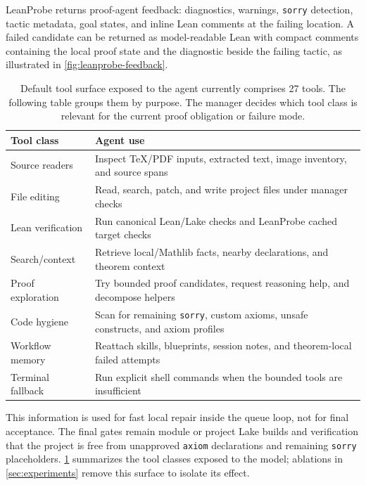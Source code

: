 \documentclass{article}
\newcommand{\lean}{Lean\xspace}
\newcommand{\mathlib}{Mathlib\xspace}
\begin{document}
LeanProbe returns proof-agent feedback: diagnostics, warnings, \texttt{sorry} detection, tactic metadata, goal states, and inline \lean comments at the failing location.
A failed candidate can be returned as model-readable \lean with compact comments containing the local proof state and the diagnostic beside the failing tactic, as illustrated in \cref{fig:leanprobe-feedback}.

\begin{table}[bth]
\centering
\caption{Default tool surface exposed to the agent currently comprises 27 tools. The following table groups them by purpose. The manager decides which tool class is relevant for the current proof obligation or failure mode.}
\label{tab:toolset}
\scriptsize
\setlength{\tabcolsep}{3pt}
\begin{tabular}{p{21mm}p{54mm}}
\toprule
Tool class & Agent use \\
\midrule
Source readers & Inspect \TeX/PDF inputs, extracted text, image inventory, and source spans \\
File editing & Read, search, patch, and write project files under manager checks \\
Lean verification & Run canonical \lean/Lake checks and LeanProbe cached target checks \\
Search/context & Retrieve local/\mathlib facts, nearby declarations, and theorem context \\
Proof exploration & Try bounded proof candidates, request reasoning help, and decompose helpers \\
Code hygiene & Scan for remaining \texttt{sorry}, custom axioms, unsafe constructs, and axiom profiles \\
Workflow memory & Reattach skills, blueprints, session notes, and theorem-local failed attempts \\
Terminal fallback & Run explicit shell commands when the bounded tools are insufficient \\
\bottomrule
\end{tabular}
\end{table}

This information is used for fast local repair inside the queue loop, not for final acceptance.
The final gates remain module or project Lake builds and verification that the project is free from unapproved \texttt{axiom} declarations and remaining \texttt{sorry} placeholders.
\cref{tab:toolset} summarizes the tool classes exposed to the model; ablations in \cref{sec:experiments} remove this surface to isolate its effect.
\end{document}

